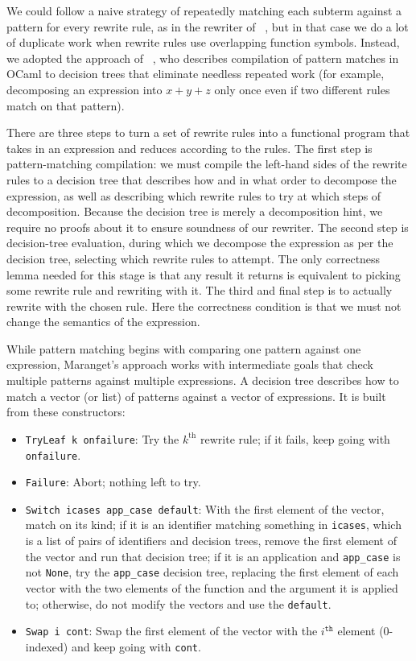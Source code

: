 \documentclass[a4paper,USenglish,cleveref,autoref,thm-restate]{lipics-v2021}
\newcommand{\citet}[1]{\usebibentry{#1}{citet}~\cite{#1}}
\begin{document}
We could follow a naive strategy of repeatedly matching each subterm against a pattern for every rewrite rule, as in the rewriter of \citet{rtac}, but in that case we do a lot of duplicate work when rewrite rules use overlapping function symbols.
Instead, we adopted the approach of \citet{maranget2008compiling}, who describes compilation of pattern matches in OCaml to decision trees that eliminate needless repeated work (for example, decomposing an expression into $x + y + z$ only once even if two different rules match on that pattern).

There are three steps to turn a set of rewrite rules into a functional program that takes in an expression and reduces according to the rules.
The first step is pattern-matching compilation: we must compile the left-hand sides of the rewrite rules to a decision tree that describes how and in what order to decompose the expression, as well as describing which rewrite rules to try at which steps of decomposition.
Because the decision tree is merely a decomposition hint, we require no proofs about it to ensure soundness of our rewriter.
The second step is decision-tree evaluation, during which we decompose the expression as per the decision tree, selecting which rewrite rules to attempt.
The only correctness lemma needed for this stage is that any result it returns is equivalent to picking some rewrite rule and rewriting with it.
The third and final step is to actually rewrite with the chosen rule.
Here the correctness condition is that we must not change the semantics of the expression.

While pattern matching begins with comparing one pattern against one expression, Maranget's approach works with intermediate goals that check multiple patterns against multiple expressions.
A decision tree describes how to match a vector (or list) of patterns against a vector of expressions.
It is built from these constructors:
\begin{itemize}
  \item \texttt{TryLeaf k onfailure}: Try the $k^\text{th}$ rewrite rule; if it fails, keep going with \texttt{onfailure}.
  \item \texttt{Failure}: Abort; nothing left to try.
  \item \texttt{Switch icases app\_case default}:
    With the first element of the vector, match on its kind; if it is an identifier matching something in \texttt{icases}, which is a list of pairs of identifiers and decision trees, remove the first element of the vector and run that decision tree; if it is an application and \texttt{app\_case} is not \texttt{None}, try the \texttt{app\_case} decision tree, replacing the first element of each vector with the two elements of the function and the argument it is applied to; otherwise, do not modify the vectors and use the \texttt{default}.
  \item \texttt{Swap i cont}: Swap the first element of the vector with the $i^\texttt{th}$ element (0-indexed) and keep going with \texttt{cont}.
\end{itemize}
\end{document}
